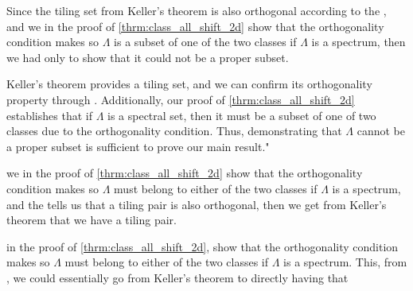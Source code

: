 \documentclass[../thesis.tex]{subfiles}
\begin{document}
\begin{remark}
    Since the tiling set from Keller's theorem is also orthogonal according to the , and we in the proof of \cref{thrm:class_all_shift_2d} show that the orthogonality condition makes so $\Lambda$ is a subset of one of the two classes if $\Lambda$ is a spectrum, then we had only to show that it could not be a proper subset.  
    
    Keller's theorem provides a tiling set, and we can confirm its orthogonality property through . Additionally, our proof of \cref{thrm:class_all_shift_2d} establishes that if $\Lambda$ is a spectral set, then it must be a subset of one of two classes due to the orthogonality condition. Thus, demonstrating that $\Lambda$ cannot be a proper subset is sufficient to prove our main result."
    
    
    we in the proof of \cref{thrm:class_all_shift_2d} show that the orthogonality condition makes so $\Lambda$ must belong to either of the two classes if $\Lambda$ is a spectrum, and the  tells us that a tiling pair is also orthogonal, then we get from Keller's theorem that we have a tiling pair. 
    
    in the proof of \cref{thrm:class_all_shift_2d}, show that the orthogonality condition makes so $\Lambda$ must belong to either of the two classes if $\Lambda$ is a spectrum. This, from , we could essentially go from Keller's theorem to directly having that  

\end{remark}




\end{document}
